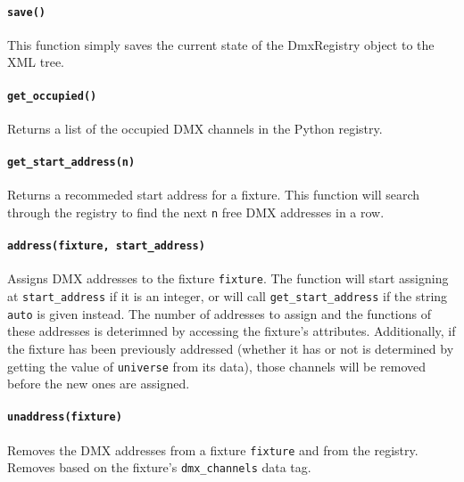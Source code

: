 \documentclass[a4paper]{article}
\begin{document}
\paragraph{\texttt{save()}}
This function simply saves the current state of the DmxRegistry object to the 
XML tree. 

\paragraph{\texttt{get\_occupied()}}
Returns a list of the occupied DMX channels in the Python registry.

\paragraph{\texttt{get\_start\_address(n)}}
Returns a recommeded start address for a fixture. This function will search 
through the registry to find the next \texttt{n} free DMX addresses in a row.

\paragraph{\texttt{address(fixture, start\_address)}}
Assigns DMX addresses to the fixture \texttt{fixture}. The function will start 
assigning at \texttt{start\_address} if it is an integer, or will call 
\texttt{get\_start\_address} if the string \texttt{auto} is given instead. 
The number of addresses to assign and the functions of these addresses is 
deterimned by accessing the fixture's attributes. Additionally, if the 
fixture has been previously addressed (whether it has or not is determined by 
getting the value of \texttt{universe} from its data), those channels will be 
removed before the new ones are assigned.

\paragraph{\texttt{unaddress(fixture)}}
Removes the DMX addresses from a fixture \texttt{fixture} and from the 
registry. Removes based on the fixture's \texttt{dmx\_channels} data tag.
\end{document}
